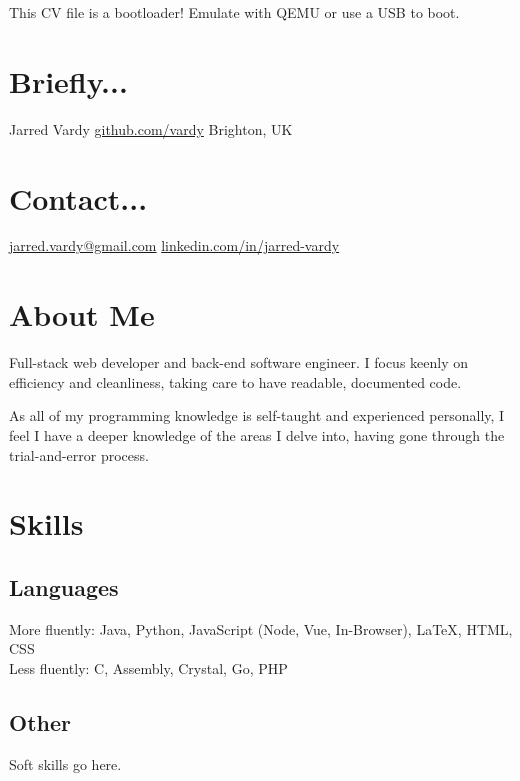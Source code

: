 \documentclass[]{jvcv}
\begin{document}
       {This CV file is a bootloader! Emulate with QEMU or use a USB to boot.}


%
\begin{aside}
	\section{Briefly...}\vspace{0.1cm}
	Jarred Vardy
	\hyperref[https://github.com/vardy/]{github.com/vardy}
	Brighton, UK
	\section{Contact...}\vspace{0.1cm}
	\hyperref[mailto:jarred.vardy@gmail.com]{jarred.vardy@gmail.com}
	\hyperref[https://linkedin.com/in/jarred-vardy]{linkedin.com/in/jarred-vardy}
\end{aside}

%
\section{About Me}
Full-stack web developer and back-end software engineer.
I focus keenly on efficiency and cleanliness, taking care to have readable, documented code.

As all of my programming knowledge is self-taught and experienced personally, I feel I have a
deeper knowledge of the areas I delve into, having gone through the trial-and-error process.

%
\vspace{0.5cm}
\section{Skills}
\subsection{Languages}
More fluently: Java, Python, JavaScript (Node, Vue, In-Browser), LaTeX, HTML, CSS\\
Less fluently: C, Assembly, Crystal, Go, PHP

\vspace{0.1cm}
\subsection{Other}
Soft skills go here.
\end{document}
